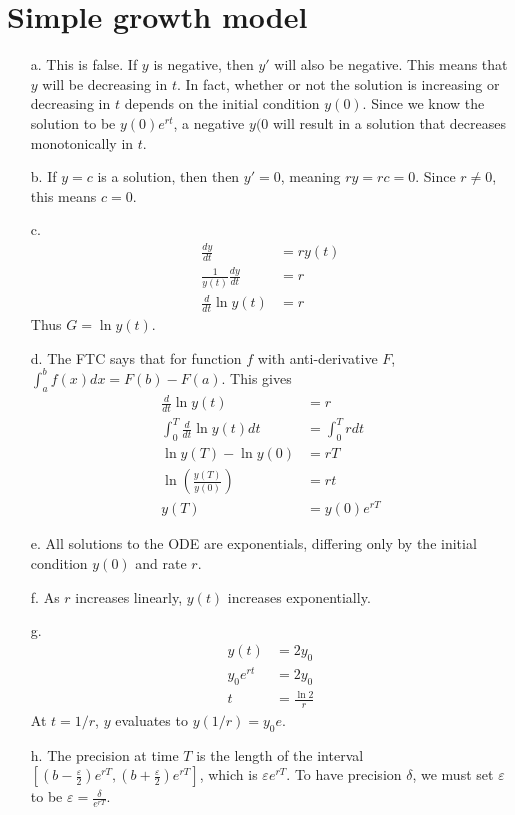 \documentclass{article}
\begin{document}
\section{Simple growth model}
\begin{enumerate}
	\item[a.]
		This is false. If $y$ is negative, then $y'$ will also be negative. This means that $y$ will be decreasing in $t$. In fact, whether or not the solution is increasing or decreasing in $t$ depends on the initial condition $y (0)$. Since we know the solution to be $y(0) e^{rt}$, a negative $y(0$ will result in a solution that decreases monotonically in $t$.
	\item[b.] If $y = c$ is a solution, then then $y'=0$, meaning $ry=rc=0$. Since $r\neq 0$, this means $c=0$.
	\item[c.]
		\begin{align*}
			\frac{d y}{d t} &= r y(t) \\
			\frac{1}{y(t)} \frac{d y}{d t} &= r \\
			\frac{d }{d t} \ln y(t) &= r
		\end{align*}
		Thus $G = \ln y(t)$.
	\item[d.] The FTC says that for function $f$ with anti-derivative $F$, $\int_{a}^{b} f(x) dx = F(b) - F(a)$. This gives
		\begin{align*}
			\frac{d}{d t} \ln y(t) &= r \\
			\int_{0}^{T} \frac{d}{d t} \ln y(t) dt &= \int_{0}^{T} r dt \\
			\ln y(T) - \ln y(0) &= r T \\
			\ln \left( \frac{y(T)}{y(0)} \right) &= r t \\
			y(T) &= y(0) e^{rT}
		\end{align*}
	\item[e.] All solutions to the ODE are exponentials, differing only by the initial condition $y(0)$ and rate $r$.
	\item[f.] As $r$ increases linearly, $y(t)$ increases exponentially.
	\item[g.]
		\begin{align*}
			y(t) &= 2 y_0 \\
			y_0 e^{rt} &= 2 y_0 \\
			t &= \frac{\ln 2}{r}
		\end{align*}
		At $t=1/r$, $y$ evaluates to $y(1/r) = y_0 e$.
	\item[h.] The precision at time $T$ is the length of the interval $\left[ \left(b-\frac{\varepsilon}{2}\right) e^{rT}, \left(b+\frac{\varepsilon}{2}\right) e^{rT} \right]$, which is $\varepsilon e^{rT}$. To have precision $\delta$, we must set $\varepsilon$ to be $\varepsilon = \frac{\delta}{e^{rT}}$.
\end{enumerate}
\end{document}
